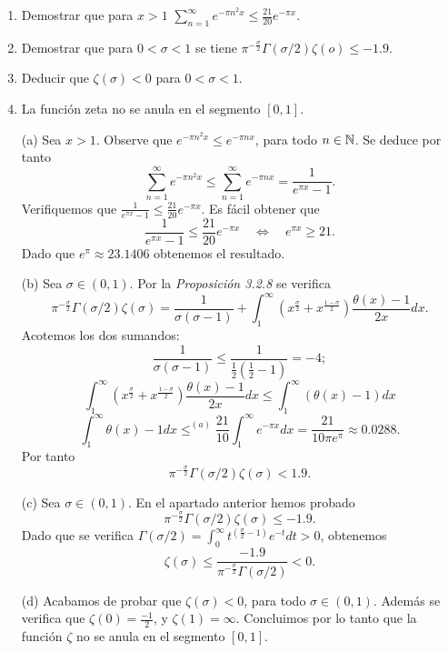 \documentclass[twoside]{article}
\begin{document}
\begin{ejercicio}{3}
\begin{enumerate}
	\item Demostrar que para $x > 1$ $\sum_{n=1}^{∞} e^{-πn^2 x} ≤ \frac{21}{20} e^{-πx}$.
	\item Demostrar que para $0 < σ < 1$ se tiene $π^{-\frac{σ}{2}}Γ(σ/2) ζ(ο) ≤ -1.9$.
	\item Deducir que $ζ(σ) < 0$ para $0 < σ < 1$.
	\item La función zeta no se anula en el segmento $[0,1]$.
\end{enumerate}
\end{ejercicio}
\begin{solucion}
\begin{itemize}
\item[(a)] Sea $x>1$. Observe que $e^{-\pi n^2x}\leq e^{-\pi nx}$, para todo $n\in\mathbb{N}$. Se deduce por tanto
\[\sum_{n=1}^{\infty}e^{-\pi n^2x}\le\sum_{n=1}^{\infty}e^{-\pi nx}=\frac{1}{e^{\pi x}-1}.\]
Verifiquemos que $\frac{1}{e^{\pi x}-1}\le\frac{21}{20}e^{-\pi x}$. Es fácil obtener que 
\[\frac{1}{e^{\pi x}-1}\le\frac{21}{20}e^{-\pi x}\quad\Leftrightarrow\quad e^{\pi x}\ge 21.\]
Dado que $e^{\pi}\approx 23.1406$ obtenemos el resultado.
\item[(b)] Sea $\sigma\in(0,1)$. Por la \emph{Proposición 3.2.8} se verifica
\[\pi^{-\frac{\sigma}{2}}\Gamma(\sigma/2)\zeta(\sigma)=\frac{1}{\sigma(\sigma-1)}+\int_{1}^{\infty}(x^{\frac{\sigma}{2}}+x^{\frac{1-\sigma}{2}})\frac{\theta(x)-1}{2x}dx.\]
Acotemos los dos sumandos:
\[\frac{1}{\sigma(\sigma-1)}\le\frac{1}{\frac{1}{2}(\frac{1}{2}-1)}=-4;\]
\[\int_{1}^{\infty}(x^{\frac{\sigma}{2}}+x^{\frac{1-\sigma}{2}})\frac{\theta(x)-1}{2x}dx\le\int_{1}^{\infty}(\theta(x)-1)dx\]
\[\int_{1}^{\infty}\theta(x)-1dx\le^{(a)}\frac{21}{10}\int_{1}^{\infty}e^{-\pi x}dx=\frac{21}{10\pi e^{\pi}}\approx 0.0288.\]
Por tanto 
\[\pi^{-\frac{\sigma}{2}}\Gamma(\sigma/2)\zeta(\sigma)<1.9.\]
\item[(c)] Sea $\sigma\in(0,1)$. En el apartado anterior hemos probado 
\[\pi^{-\frac{\sigma}{2}}\Gamma(\sigma/2)\zeta(\sigma)\le -1.9\textrm{.}\] 
Dado que se verifica $\Gamma(\sigma/2)=\int_{0}^{\infty}t^{(\frac{\sigma}{2}-1)}e^{-t}dt>0$, obtenemos 
\[\zeta(\sigma)\le \frac{-1.9}{\pi^{-\frac{\sigma}{2}}\Gamma(\sigma/2)}<0\textrm{.}\]
\item[(d)] Acabamos de probar que $\zeta(\sigma)<0$, para todo $\sigma\in(0,1)$. Además se verifica que $\zeta(0)=\frac{-1}{2}$, y $\zeta(1)=\infty$. Concluimos por lo tanto que la función $\zeta$ no se anula en el segmento $[0,1]$.
\end{itemize} 
\end{solucion}
\newpage
\end{document}
